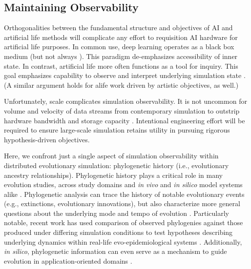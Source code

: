 \subsection{Maintaining Observability}

Orthogonalities between the fundamental structure and objectives of AI and artificial life methods will complicate any effort to requisition AI hardware for artificial life purposes.
In common use, deep learning operates as a black box medium \citep{loyola2019black} (but not always \citep{mahendran2015understanding}).
This paradigm de-emphasizes accessibility of inner state.
In contrast, artificial life more often functions as a tool for inquiry.
This goal emphasizes capability to observe and interpret underlying simulation state \citep{moreno2023toward,horgan1995complexity}.
(A similar argument holds for alife work driven by artistic objectives, as well.)

Unfortunately, scale complicates simulation observability.
It is not uncommon for volume and velocity of data streams from contemporary simulation to outstrip hardware bandwidth and storage capacity \citep{osti_1770192}.
Intentional engineering effort will be required to ensure large-scale simulation retains utility in pursuing rigorous hypothesis-driven objectives.

Here, we confront just a single aspect of simulation observability within distributed evolutionary simulation: phylogenetic history (i.e., evolutionary ancestry relationships).
Phylogenetic history plays a critical role in many evolution studies, across study domains and \textit{in vivo} and \textit{in silico} model systems alike \citep{faithConservationEvaluationPhylogenetic1992, STAMATAKIS2005phylogenetics,frenchHostPhylogenyShapes2023,kim2006discovery,lewinsohnStatedependentEvolutionaryModels2023a,lenski2003evolutionary}.
Phylogenetic analysis can trace the history of notable evolutionary events (e.g., extinctions, evolutionary innovations), but also characterize more general questions about the underlying mode and tempo of evolution \citep{moreno2023toward,hernandez2022can,shahbandegan2022untangling,lewinsohnStatedependentEvolutionaryModels2023a}.
Particularly notable, recent work has used comparison of observed phylogenies against those produced under differing simulation conditions to test hypotheses describing underlying dynamics within real-life evo-epidemiological systems \citep{giardina2017inference,voznica2022deep}.
Additionally, \textit{in silico}, phylogenetic information can even serve as a mechanism to guide evolution in application-oriented domains \citep{lalejini2024phylogeny,lalejini2024runtime,murphy2008simple,burke2003increased}.

